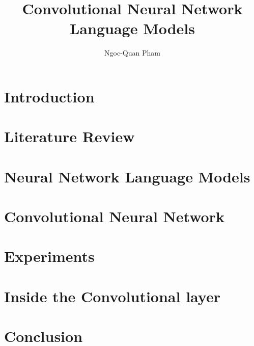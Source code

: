 \documentclass[12pt]{report}
\begin{document}
\title{Convolutional Neural Network Language Models}
\author{Ngoc-Quan Pham}

\beforepreface
%
%
\afterpreface


\chapter{Introduction}
\label{c:intro}


\chapter{Literature Review}
\label{c:review}


\chapter{Neural Network Language Models}
\label{c:nnlm}

\chapter{Convolutional Neural Network}
\label{c:cnn}

\chapter{Experiments}
\label{c:exp}

\chapter{Inside the Convolutional layer}
\label{c:analysis}

\chapter{Conclusion}
\label{c:conc}

\end{document}
